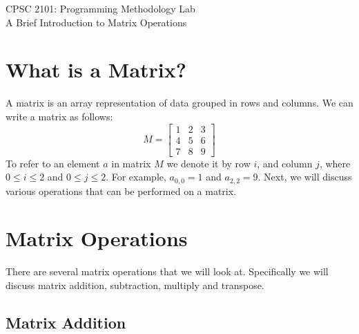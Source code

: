 \documentclass[12pt]{article}
\begin{document}
\begin{center}
\normalsize{CPSC 2101: Programming Methodology Lab} \\
\vspace{.2cm}
\large{A Brief Introduction to Matrix Operations} \\
\end{center}

\section{What is a Matrix?}
A matrix is an array representation of data grouped in rows and columns. We can write a matrix as follows:
\[
M =
	\begin{bmatrix} 
		1 & 2 & 3 \\
		4 & 5 & 6 \\
		7 & 8 & 9
	\end{bmatrix}
\]
To refer to an element $a$ in matrix $M$ we denote it by row $i$, and column $j$, where $0 \leq i \leq 2$ and $0 \leq j \leq 2$. For example, $a_{0,0} = 1$ and $a_{2,2} = 9$. Next, we will discuss various operations that can be performed on a matrix.

\section{Matrix Operations}

There are several matrix operations that we will look at. Specifically we will discuss matrix addition, subtraction, multiply and transpose.

\subsection{Matrix Addition}
\end{document}
